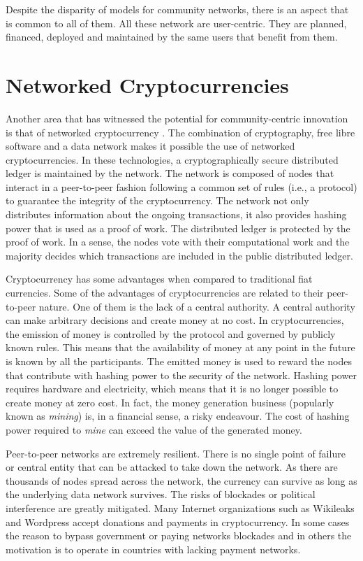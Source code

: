 \documentclass[journal]{IEEEtran}
\begin{document}
Despite the disparity of models for community networks, there is an aspect that is common to all of them.
All these network are user-centric.
They are planned, financed, deployed and maintained by the same users that benefit from them.



\section{Networked Cryptocurrencies}
\label{sec:networked-cryptocurrencies}

Another area that has witnessed the potential for community-centric innovation is that of networked cryptocurrency \cite{nakamoto2008bpe}.
The combination of cryptography, free libre software and a data network makes it possible the use of networked cryptocurrencies.
In these technologies, a cryptographically secure distributed ledger is maintained by the network.
The network is composed of nodes that interact in a peer-to-peer fashion following a common set of rules (i.e., a protocol) to guarantee the integrity of the cryptocurrency.
The network not only distributes information about the ongoing transactions, it also provides hashing power that is used as a proof of work.
The distributed ledger is protected by the proof of work.
In a sense, the nodes vote with their computational work and the majority decides which transactions are included in the public distributed ledger.

Cryptocurrency has some advantages when compared to traditional fiat currencies.
Some of the advantages of cryptocurrencies are related to their peer-to-peer nature.
One of them is the lack of a central authority.
A central authority can make arbitrary decisions and create money at no cost.
In cryptocurrencies, the emission of money is controlled by the protocol and governed by publicly known rules.
This means that the availability of money at any point in the future is known by all the participants.
The emitted money is used to reward the nodes that contribute with hashing power to the security of the network.
Hashing power requires hardware and electricity, which means that it is no longer possible to create money at zero cost.
In fact, the money generation business (popularly known as \emph{mining}) is, in a financial sense, a risky endeavour.
The cost of hashing power required to \emph{mine} can exceed the value of the generated money.

Peer-to-peer networks are extremely resilient.
There is no single point of failure or central entity that can be attacked to take down the network.
As there are thousands of nodes spread across the network, the currency can survive as long as the underlying data network survives.
The risks of blockades or political interference are greatly mitigated.
Many Internet organizations such as Wikileaks and Wordpress accept donations and payments in cryptocurrency.
In some cases the reason to bypass government or paying networks blockades and in others the motivation is to operate in countries with lacking payment networks.
\end{document}

